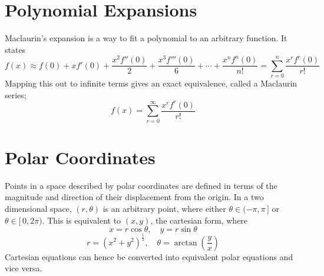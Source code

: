 \documentclass{article}
\begin{document}
\section{Polynomial Expansions}

Maclaurin's expansion is a way to fit a polynomial to an arbitrary function. It
states \[f(x) \approx f(0) + xf'(0) + \frac{x^2f''(0)}{2} +
    \frac{x^3f'''(0)}{6} + \cdots + \frac{x^nf^n(0)}{n!} = \sum_{r=0}^{n}
\frac{x^rf^r(0)}{r!}\] Mapping this out to infinite terms gives an exact
equivalence, called a Maclaurin series; \[f(x) = \sum_{r = 0}^{\infty}
\frac{x^rf^r(0)}{r!}\]

\section{Polar Coordinates}

\begin{multicols}{2}

    \begin{center}


    \end{center}

    \noindent Points in a space described by polar coordinates are defined in
    terms of the magnitude and direction of their displacement from the origin.
    In a two dimensional space, \(\left( r, \theta \right)\) is an arbitrary
    point, where either \(\theta \in (-\pi, \pi \,]\) or \(\theta \in [\, 0, 2
    \pi)\). This is equivalent to \((x, y)\), the cartesian form, where \[x = r
    \cos \theta, \quad y = r \sin \theta\] \[r = \left( x^2 + y^2
        \right)^{\frac{1}{2}}, \quad \theta = \arctan \left( \frac{y}{x}
    \right)\] Cartesian equations can hence be converted into equivalent polar
    equations and vice versa. 

\end{multicols}
\end{document}
